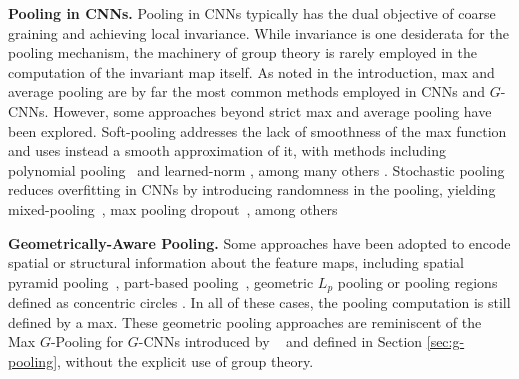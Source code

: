 \textbf{Pooling in CNNs.} Pooling in CNNs typically has the dual objective of coarse graining and achieving local invariance. While invariance is one desiderata for the pooling mechanism, the machinery of group theory is rarely employed in the computation of the invariant map itself. As noted in the introduction, max and average pooling are by far the most common methods employed in CNNs and $G$-CNNs. However, some approaches beyond strict max and average pooling have been explored.
Soft-pooling addresses the lack of smoothness of the max function and uses instead a smooth approximation of it, with methods including polynomial pooling~\cite{wei2019building} and learned-norm \cite{gulcehre2014learned}, among many others \cite{estrach2014signal,eom2020alphaintegration, shahriari2017multipartite,shi2016rank,bieder2021comparison,stergiou2021refining,czaja2021maximal,kumar2018ordinal}.
Stochastic pooling~\cite{zeiler2013stochastic,} reduces overfitting in CNNs by introducing randomness in the pooling, yielding mixed-pooling~\cite{yu2014mixed}, max pooling dropout~\cite{wu2015max}, among others~\cite{tong2016hybrid,zhai2017s3pool,graham2014fractional}


\textbf{Geometrically-Aware Pooling.} Some approaches have been adopted to encode spatial or structural information about the feature maps, including spatial pyramid pooling~\cite{he2015spatial}, part-based pooling~\cite{zhang2012pose}, geometric $L_p$ pooling \cite{feng2011geometric} or pooling regions defined as concentric circles \cite{qi2018concentric}. In all of these cases, the pooling computation is still defined by a max. These geometric pooling approaches are reminiscent of the Max $G$-Pooling for $G$-CNNs introduced by ~\cite{cohen2016group} and defined in Section \ref{sec:g-pooling}, without the explicit use of group theory.

